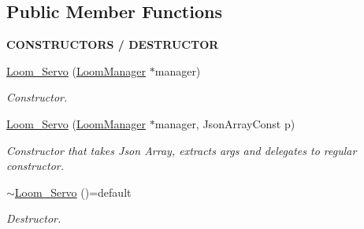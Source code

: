 \subsection*{Public Member Functions}
\begin{Indent}{\bf C\+O\+N\+S\+T\+R\+U\+C\+T\+O\+RS / D\+E\+S\+T\+R\+U\+C\+T\+OR}\par
\begin{DoxyCompactItemize}
\item 
\hyperlink{class_loom___servo_aa3e32332e83beb6aaf86d5023d42553b}{Loom\+\_\+\+Servo} (\hyperlink{class_loom_manager}{Loom\+Manager} $\ast$manager)
\begin{DoxyCompactList}\small\item\em Constructor. \end{DoxyCompactList}\item 
\hyperlink{class_loom___servo_a9e75b4ccc8df31566706ab885b38d124}{Loom\+\_\+\+Servo} (\hyperlink{class_loom_manager}{Loom\+Manager} $\ast$manager, Json\+Array\+Const p)
\begin{DoxyCompactList}\small\item\em Constructor that takes Json Array, extracts args and delegates to regular constructor. \end{DoxyCompactList}\item 
\hyperlink{class_loom___servo_a3c2df2b679a2074288ea31a2fed39897}{$\sim$\+Loom\+\_\+\+Servo} ()=default
\begin{DoxyCompactList}\small\item\em Destructor. \end{DoxyCompactList}\end{DoxyCompactItemize}
\end{Indent}
